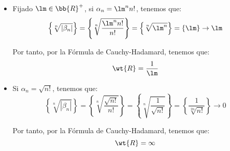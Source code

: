 \begin{ejercicio}
\begin{enumerate}
\begin{itemize}
\begin{itemize}
                \item Fijado $\lm\in \bb{R}^+$, si $\alpha_n=\lm^nn!$, tenemos que:
                \begin{equation*}
                    \left\{\sqrt[n]{|\beta_n|}\right\} = \left\{\sqrt[n]{\dfrac{\lm^nn!}{n!}}\right\} = \left\{\sqrt[n]{\lm^n}\right\} = \left\{\lm\right\}\to \lm
                \end{equation*}

                Por tanto, por la Fórmula de Cauchy-Hadamard, tenemos que:
                \begin{equation*}
                    \wt{R} = \dfrac{1}{\lm}
                \end{equation*}

                \item Si $\alpha_n=\sqrt{n!}$, tenemos que:
                \begin{equation*}
                    \left\{\sqrt[n]{|\beta_n|}\right\} = \left\{\sqrt[n]{\dfrac{\sqrt{n!}}{n!}}\right\} = \left\{\sqrt[n]{\dfrac{1}{\sqrt{n!}}}\right\}
                    = \left\{\dfrac{1}{\sqrt[2n]{n!}}\right\}\to 0
                \end{equation*}

                Por tanto, por la Fórmula de Cauchy-Hadamard, tenemos que:
                \begin{equation*}
                    \wt{R} = \infty
                \end{equation*}
            \end{itemize}
        \end{itemize}
    \end{enumerate}
\end{ejercicio}

